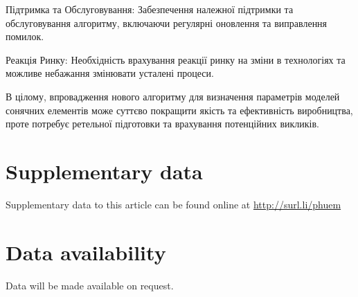 \documentclass[a4paper,fleqn]{cas-sc}
\begin{document}
    Підтримка та Обслуговування:
        Забезпечення належної підтримки та обслуговування алгоритму, включаючи регулярні оновлення та виправлення помилок.

    Реакція Ринку:
        Необхідність врахування реакції ринку на зміни в технологіях та можливе небажання змінювати усталені процеси.

В цілому, впровадження нового алгоритму для визначення параметрів моделей сонячних елементів може суттєво покращити якість та ефективність виробництва, проте потребує ретельної підготовки та врахування потенційних викликів.




\section*{Supplementary data}
Supplementary data to this article can be found online at
\url{http://surl.li/phuem}


\section*{Data availability}
Data will be made available on request.




\end{document}

